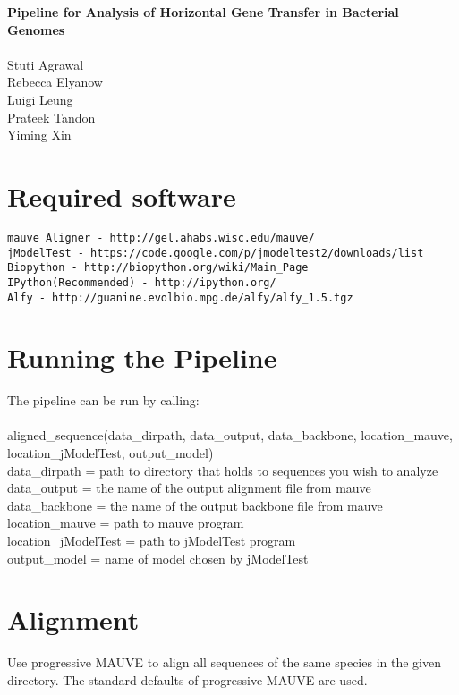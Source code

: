 \documentclass[11pt]{article}
\begin{document}
\begin{center}
\textbf{\LARGE{Pipeline for Analysis of Horizontal Gene Transfer in Bacterial Genomes}}\\
~~~\\
\Large{Stuti Agrawal}\\
\Large{Rebecca Elyanow}\\
\Large{Luigi Leung}\\
\Large{Prateek Tandon}\\
\Large{Yiming Xin}
\end{center}
\tableofcontents



\section{Required software}
\begin{verbatim}
mauve Aligner - http://gel.ahabs.wisc.edu/mauve/
jModelTest - https://code.google.com/p/jmodeltest2/downloads/list
Biopython - http://biopython.org/wiki/Main_Page
IPython(Recommended) - http://ipython.org/
Alfy - http://guanine.evolbio.mpg.de/alfy/alfy_1.5.tgz
\end{verbatim}
\section{Running the Pipeline}
The pipeline can be run by calling:\\
\\
aligned\_sequence(data\_dirpath, data\_output, data\_backbone, location\_mauve, location\_jModelTest, output\_model)\\

data\_dirpath = path to directory that holds to sequences you wish to analyze\\
data\_output = the name of the output alignment file from mauve\\
data\_backbone = the name of the output backbone file from mauve\\
location\_mauve = path to mauve program\\
location\_jModelTest = path to jModelTest program\\
output\_model = name of model chosen by jModelTest\\

\section{Alignment}
Use progressive MAUVE \cite{mauve} to align all sequences of the same species in the given directory. The standard defaults of progressive MAUVE are used.\\
\end{document}
